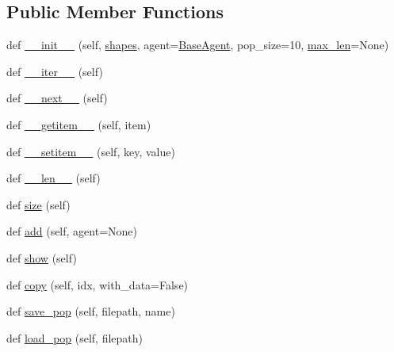 \subsection*{Public Member Functions}
\begin{DoxyCompactItemize}
\item 
def \hyperlink{classtaxons_1_1core_1_1evolution_1_1population_1_1_population_abf29b28df9a2197533c1d2eb2536b8d1}{\+\_\+\+\_\+init\+\_\+\+\_\+} (self, \hyperlink{classtaxons_1_1core_1_1evolution_1_1population_1_1_population_ab32f467a98b76b3a49fd51ae2c3de7ab}{shapes}, agent=\hyperlink{classtaxons_1_1core_1_1evolution_1_1agents_1_1_base_agent}{Base\+Agent}, pop\+\_\+size=10, \hyperlink{classtaxons_1_1core_1_1evolution_1_1population_1_1_population_a699a357a32308ad63d09479e96336dba}{max\+\_\+len}=None)
\item 
def \hyperlink{classtaxons_1_1core_1_1evolution_1_1population_1_1_population_a262e2f801d57425651e73496f7ecddc1}{\+\_\+\+\_\+iter\+\_\+\+\_\+} (self)
\item 
def \hyperlink{classtaxons_1_1core_1_1evolution_1_1population_1_1_population_a09c72fda524dc853f06fb6af7e1439aa}{\+\_\+\+\_\+next\+\_\+\+\_\+} (self)
\item 
def \hyperlink{classtaxons_1_1core_1_1evolution_1_1population_1_1_population_a65fd9cd90e50883266b60cdae31cbdfa}{\+\_\+\+\_\+getitem\+\_\+\+\_\+} (self, item)
\item 
def \hyperlink{classtaxons_1_1core_1_1evolution_1_1population_1_1_population_add57abb09cb1ee7d13eba7ba1fdb705c}{\+\_\+\+\_\+setitem\+\_\+\+\_\+} (self, key, value)
\item 
def \hyperlink{classtaxons_1_1core_1_1evolution_1_1population_1_1_population_a8136fcaeb3098c6727b0d1abbd399b22}{\+\_\+\+\_\+len\+\_\+\+\_\+} (self)
\item 
def \hyperlink{classtaxons_1_1core_1_1evolution_1_1population_1_1_population_af7fc8419b89c3f66714202ff945f87df}{size} (self)
\item 
def \hyperlink{classtaxons_1_1core_1_1evolution_1_1population_1_1_population_a571ef6b55f7b341eb7ca8875aeef9d12}{add} (self, agent=None)
\item 
def \hyperlink{classtaxons_1_1core_1_1evolution_1_1population_1_1_population_a7cdd0d70894c1af2bd6f7be0b4ece716}{show} (self)
\item 
def \hyperlink{classtaxons_1_1core_1_1evolution_1_1population_1_1_population_a1561206a18a1ec04842e2436b8b050d7}{copy} (self, idx, with\+\_\+data=False)
\item 
def \hyperlink{classtaxons_1_1core_1_1evolution_1_1population_1_1_population_ac2f957b6e89ac29cdcb3f6ac97388342}{save\+\_\+pop} (self, filepath, name)
\item 
def \hyperlink{classtaxons_1_1core_1_1evolution_1_1population_1_1_population_a6f6bce47b869bba6609f92ceb50a39bd}{load\+\_\+pop} (self, filepath)
\end{DoxyCompactItemize}
